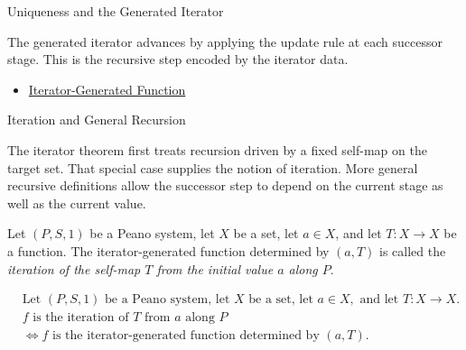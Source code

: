\begin{topicbox}{Uniqueness and the Generated Iterator}
\begin{remark*}[Interpretation]
The generated iterator advances by applying the update rule at each successor
stage. This is the recursive step encoded by the iterator data.
\end{remark*}

\begin{remark*}[Dependencies]
\begin{itemize}
  \item \hyperref[def:iterator-generated-function]{Iterator-Generated Function}
\end{itemize}
\end{remark*}
\end{topicbox}

\begin{topicbox}{Iteration and General Recursion}
\begin{exposition}
The iterator theorem first treats recursion driven by a fixed self-map on the
target set. That special case supplies the notion of iteration. More general
recursive definitions allow the successor step to depend on the current stage
as well as the current value.
\end{exposition}

\begin{tcolorbox}[colback=defbox, colframe=defborder, arc=2pt,
  left=6pt, right=6pt, top=4pt, bottom=4pt,
  title={\small\textbf{Definition (Iteration of a Self-Map)}},
  fonttitle=\small\bfseries]
\begin{definition}
\label{def:iteration-of-a-self-map}
Let $(P,S,1)$ be a Peano system, let $X$ be a set, let $a \in X$, and let
$T : X \to X$ be a function. The iterator-generated function determined by
$(a,T)$ is called the \emph{iteration of the self-map $T$ from the initial
value $a$ along $P$}.
\end{definition}
\end{tcolorbox}

\begin{remark*}
\[
\begin{aligned}
&\text{Let } (P,S,1) \text{ be a Peano system, let } X \text{ be a set, let } a \in X, \text{ and let } T : X \to X.\\
&f \text{ is the iteration of } T \text{ from } a \text{ along } P\\
&\Longleftrightarrow
f \text{ is the iterator-generated function determined by } (a,T).
\end{aligned}
\]
\end{remark*}


\end{topicbox}
